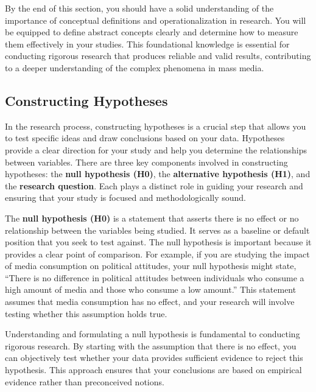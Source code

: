 \documentclass[
]{book}
\begin{document}
By the end of this section, you should have a solid understanding of the importance of conceptual definitions and operationalization in research. You will be equipped to define abstract concepts clearly and determine how to measure them effectively in your studies. This foundational knowledge is essential for conducting rigorous research that produces reliable and valid results, contributing to a deeper understanding of the complex phenomena in mass media.

\subsection{Constructing Hypotheses}\label{constructing-hypotheses}

In the research process, constructing hypotheses is a crucial step that allows you to test specific ideas and draw conclusions based on your data. Hypotheses provide a clear direction for your study and help you determine the relationships between variables. There are three key components involved in constructing hypotheses: the \textbf{null hypothesis (H0)}, the \textbf{alternative hypothesis (H1)}, and the \textbf{research question}. Each plays a distinct role in guiding your research and ensuring that your study is focused and methodologically sound.

The \textbf{null hypothesis (H0)} is a statement that asserts there is no effect or no relationship between the variables being studied. It serves as a baseline or default position that you seek to test against. The null hypothesis is important because it provides a clear point of comparison. For example, if you are studying the impact of media consumption on political attitudes, your null hypothesis might state, ``There is no difference in political attitudes between individuals who consume a high amount of media and those who consume a low amount.'' This statement assumes that media consumption has no effect, and your research will involve testing whether this assumption holds true.

Understanding and formulating a null hypothesis is fundamental to conducting rigorous research. By starting with the assumption that there is no effect, you can objectively test whether your data provides sufficient evidence to reject this hypothesis. This approach ensures that your conclusions are based on empirical evidence rather than preconceived notions.
\end{document}
